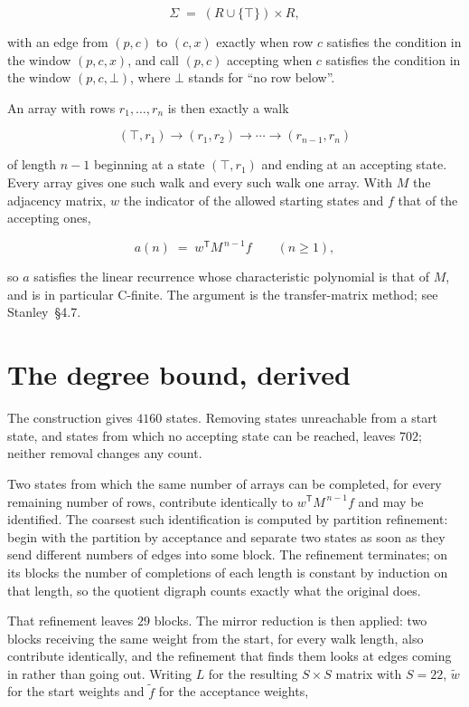 \documentclass[11pt]{article}
\theoremstyle{definition}
\begin{document}
\[\Sigma \;=\; (R \cup \{\top\}) \times R,\]

with an edge from $(p,c)$ to $(c,x)$ exactly when row $c$ satisfies the condition in the window $(p,c,x)$, and call $(p,c)$ accepting when $c$ satisfies the condition in the window $(p,c,\bot)$, where $\bot$ stands for ``no row below''.

An array with rows $r_1,\dots,r_n$ is then exactly a walk

\[(\top,r_1) \to (r_1,r_2) \to \cdots \to (r_{n-1},r_n)\]

of length $n-1$ beginning at a state $(\top,r_1)$ and ending at an accepting state. Every array gives one such walk and every such walk one array. With $M$ the adjacency matrix, $w$ the indicator of the allowed starting states and $f$ that of the accepting ones,

\[a(n) \;=\; w^{\mathsf T} M^{\,n-1} f \qquad (n \ge 1),\]

so $a$ satisfies the linear recurrence whose characteristic polynomial is that of $M$, and is in particular C-finite. The argument is the transfer-matrix method; see Stanley~\S4.7.

\section{The degree bound, derived}

The construction gives $4160$ states. Removing states unreachable from a start state, and states from which no accepting state can be reached, leaves $702$; neither removal changes any count.

Two states from which the same number of arrays can be completed, for every remaining number of rows, contribute identically to $w^{\mathsf T}M^{\,n-1}f$ and may be identified. The coarsest such identification is computed by partition refinement: begin with the partition by acceptance and separate two states as soon as they send different numbers of edges into some block. The refinement terminates; on its blocks the number of completions of each length is constant by induction on that length, so the quotient digraph counts exactly what the original does.

That refinement leaves $29$ blocks. The mirror reduction is then applied: two blocks receiving the same weight from the start, for every walk length, also contribute identically, and the refinement that finds them looks at edges coming in rather than going out. Writing $L$ for the resulting $S \times S$ matrix with $S = 22$, $\tilde w$ for the start weights and $\tilde f$ for the acceptance weights,
\end{document}
